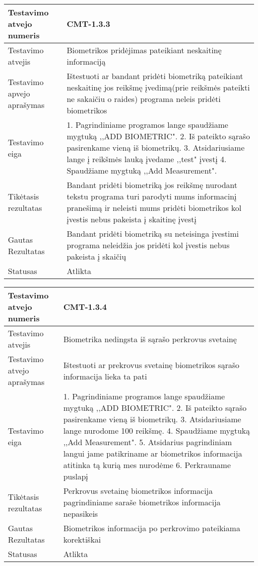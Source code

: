 \documentclass[oneside]{VUMIFPSkursinis}
\begin{document}
\begin{center}
    \begin{tabular}{ |p{5cm}|p{13cm}|}
    \hline
    	Testavimo atvejo numeris & CMT-1.3.3 \\ \hline
    	Testavimo atvejis &Biometrikos pridėjimas pateikiant neskaitinę informaciją \\ \hline
	Testavimo apvejo aprašymas & Ištestuoti ar bandant pridėti biometriką pateikiant neskaitinę jos reikšmę įvedimą(prie reikšmės pateikti ne sakaičiu o raides) programa neleis pridėti biometrikos  \\ \hline
	Testavimo eiga & 1. Pagrindiniame programos lange spaudžiame mygtuką ,,ADD BIOMETRIC". 
				2. Iš pateikto sąrašo pasirenkame vieną iš biometrikų. 
				3. Atsidariusiame lange į reikšmės lauką įvedame ,,test" įvestį
				4. Spaudžiame mygtuką ,,Add Measurement".\\ \hline
	Tikėtasis rezultatas & Bandant pridėti biometriką jos reikšmę nurodant tekstu programa turi parodyti mums informacinį pranešimą ir neleisti mums pridėti biometrikos kol įvestis nebus pakeista į skaitinę įvestį \\ \hline
	Gautas Rezultatas & Bandant pridėti biometriką su neteisinga įvestimi programa neleidžia jos pridėti kol įvestis nebus pakeista į skaičių \\ \hline
	Statusas & Atlikta \\ \hline
    \hline
    \end{tabular}
\end{center}

\begin{center}
    \begin{tabular}{ |p{5cm}|p{13cm}|}
    \hline
        Testavimo atvejo numeris & CMT-1.3.4  \\ \hline
        Testavimo atvejis & Biometrika nedingsta iš sąrašo perkrovus svetainę  \\ \hline
        Testavimo atvejo aprašymas & Ištestuoti ar prekrovus svetainę biometrikos sąrašo informacija lieka ta pati  \\ \hline
        Testavimo eiga &  1. Pagrindiniame programos lange spaudžiame mygtuką ,,ADD BIOMETRIC". 
				2. Iš pateikto sąrašo pasirenkame vieną iš biometrikų. 
				3. Atsidariusiame lange nurodome 100 reikšmę.
				4. Spaudžiame mygtuką ,,Add Measurement".
				5. Atsidarius pagrindiniam langui jame patikriname ar biometrikos informacija atitinka tą kurią mes nurodėme
				6. Perkrauname puslapį\\ \hline
        Tikėtasis rezultatas &  Perkrovus svetainę biometrikos informacija pagrindiniame saraše biometrikos informacija nepasikeis\\ \hline
        Gautas Rezultatas & Biometrikos informacija po perkrovimo pateikiama korektiškai  \\ \hline
        Statusas & Atlikta  \\ \hline
    \hline
    \end{tabular}
\end{center}
\end{document}
